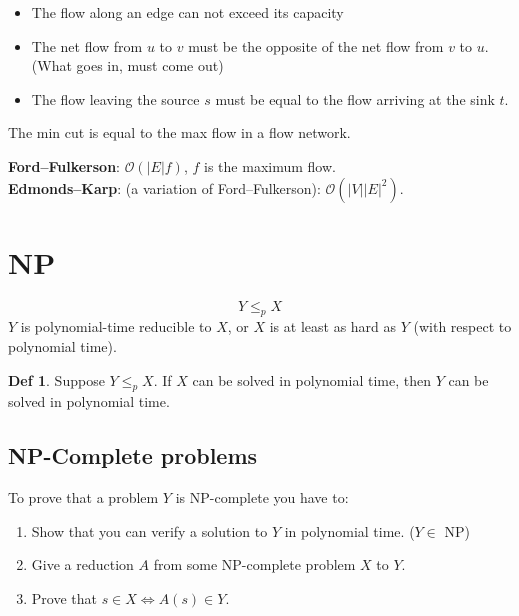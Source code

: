 \documentclass[a4paper,landscape]{article}
\theoremstyle{definition}
\newtheorem*{definition}{Def}
\begin{document}
\begin{multicols*}{3}

\begin{itemize}
	\item The flow along an edge can not exceed its capacity
	\item The net flow from $u$ to $v$ must be the opposite of the net flow
		from $v$ to $u$. (What goes in, must come out)
	\item The flow leaving the source $s$ must be equal to the flow
		arriving at the sink $t$.
\end{itemize}

The min cut is equal to the max flow in a flow network.

\textbf{Ford--Fulkerson}:
$\mathcal{O}(\vert{E}\vert f)$, $f$ is the maximum flow. \\
\textbf{Edmonds--Karp}: (a variation of Ford--Fulkerson):
$\mathcal{O}(\vert{V}\vert \vert{E}\vert^2)$.



\section{NP}
$$ Y \leq_p X $$
$Y$ is polynomial-time reducible to $X$, or $X$ is at least as hard as
$Y$ (with respect to polynomial time).

\begin{definition}
	Suppose $Y \leq_p X$. If $X$ can be solved in polynomial time, then $Y$
	can be solved in polynomial time.
\end{definition}

\subsection{NP-Complete problems}
To prove that a problem $Y$ is NP-complete you have to:
\begin{enumerate}
	\item Show that you can verify a solution to $Y$ in polynomial time.
		($Y \in$ NP)
	\item Give a reduction $A$ from some NP-complete problem $X$ to $Y$.
	\item Prove that $s \in X \Leftrightarrow A(s) \in Y$.
\end{enumerate}
\columnbreak

\end{multicols*}
\end{document}
